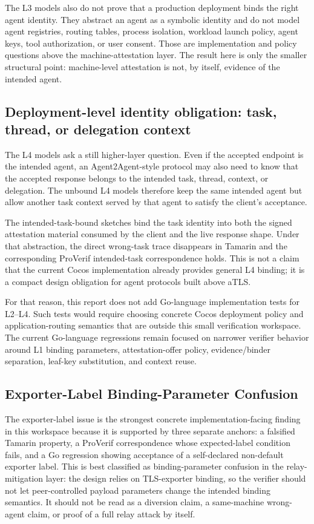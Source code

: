 \documentclass[11pt,a4paper]{article}
\begin{document}
The L3 models also do not prove that a production deployment binds the right
agent identity. They abstract an agent as a symbolic identity and do not model
agent registries, routing tables, process isolation, workload launch policy,
agent keys, tool authorization, or user consent. Those are implementation and
policy questions above the machine-attestation layer. The result here is only
the smaller structural point: machine-level attestation is not, by itself,
evidence of the intended agent.

\subsection{Deployment-level identity obligation: task, thread, or delegation context}

The L4 models ask a still higher-layer question. Even if the accepted endpoint
is the intended agent, an Agent2Agent-style protocol may also need to know that
the accepted response belongs to the intended task, thread, context, or
delegation. The unbound L4 models therefore keep the same intended agent but
allow another task context served by that agent to satisfy the client's
acceptance.

The intended-task-bound sketches bind the task identity into both the signed
attestation material consumed by the client and the live response shape. Under
that abstraction, the direct wrong-task trace disappears in Tamarin and the
corresponding ProVerif intended-task correspondence holds. This is not a claim
that the current Cocos implementation already provides general L4 binding; it
is a compact design obligation for agent protocols built above aTLS.

For that reason, this report does not add Go-language implementation tests for
L2--L4. Such tests would require choosing concrete Cocos deployment policy and
application-routing semantics that are outside this small verification
workspace. The current Go-language regressions remain focused on narrower
verifier behavior around L1 binding parameters, attestation-offer policy,
evidence/binder separation, leaf-key substitution, and context reuse.

\subsection{Exporter-Label Binding-Parameter Confusion}

The exporter-label issue is the strongest concrete implementation-facing
finding in this workspace because it is supported by three separate anchors: a
falsified Tamarin property, a ProVerif correspondence whose expected-label
condition fails, and a Go regression showing acceptance of a self-declared
non-default exporter label. This is best classified as binding-parameter
confusion in the relay-mitigation layer: the design relies on TLS-exporter
binding, so the verifier should not let peer-controlled payload parameters
change the intended binding semantics. It should not be read as a diversion
claim, a same-machine wrong-agent claim, or proof of a full relay attack by
itself.
\end{document}
